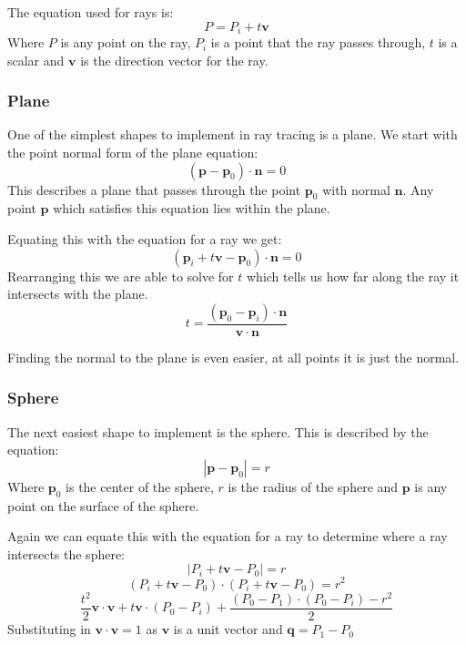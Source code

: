     \noindent The equation used for rays is:
    \[ P = P_i + t \mathbf{v} \]
    Where $P$ is any point on the ray, $P_i$ is a point that the ray passes
    through, $t$ is a scalar and $\mathbf{v}$ is the direction vector for the
    ray.

    \subsubsection{Plane}
      One of the simplest shapes to implement in ray tracing is a plane.  We
      start with the point normal form of the plane equation:
      \[ \left( \mathbf{p} - \mathbf{p}_0 \right) \cdot \mathbf{n} = 0 \]
      This describes a plane that passes through the point $\mathbf{p}_0$ with
      normal $\mathbf{n}$.  Any point $\mathbf{p}$ which satisfies this equation
      lies within the plane.

      Equating this with the equation for a ray we get:
      \[ \left( \mathbf{p}_i + t \mathbf{v} - \mathbf{p}_0 \right) \cdot \mathbf{n} = 0 \]
      Rearranging this we are able to solve for $t$ which tells us how far
      along the ray it intersects with the plane.
      \[ t  = \frac{\left( \mathbf{p}_0 - \mathbf{p}_i \right) \cdot \mathbf{n}}{\mathbf{v} \cdot \mathbf{n}}\]

      Finding the normal to the plane is even easier, at all points it is just
      the normal.

    \subsubsection{Sphere}
      The next easiest shape to implement is the sphere.  This is described by
      the equation:
      \[ \left| \mathbf{p} - \mathbf{p}_0 \right| = r \]
      Where $\mathbf{p}_0$ is the center of the sphere, $r$ is the radius of the
      sphere and $\mathbf{p}$ is any point on the surface of the sphere.

      Again we can equate this with the equation for a ray to determine where a
      ray intersects the sphere:
      \[ \left| P_i + t \mathbf{v} - P_0 \right| = r \]
      \[ \left( P_i + t \mathbf{v} - P_0 \right) \cdot \left(
      P_i + t \mathbf{v} - P_0 \right) = r^2 \]
      \[ \frac{t^2}{2} \mathbf{v} \cdot \mathbf{v} + t \mathbf{v} \cdot \left(P_0 -
      P_i\right) + \frac{\left(P_0 - P_1\right) \cdot
      \left(P_0 - P_i\right) - r^2}{2} \]
      Substituting in $\mathbf{v} \cdot \mathbf{v} = 1$ as $\mathbf{v}$ is a unit vector and $\mathbf{q} = P_1 - P_0$ 
      
      
